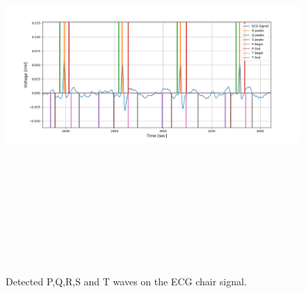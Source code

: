 \begin{figure}[htpb]
	\centering
	\includegraphics[width=15cm,height=15cm,keepaspectratio=true]{images/device_ecg_feature_extraction.png}
	\caption{
		Detected P,Q,R,S and T waves on the ECG chair signal.
	}
	\label{fig:device_ecg_feature_extraction}
\end{figure}
